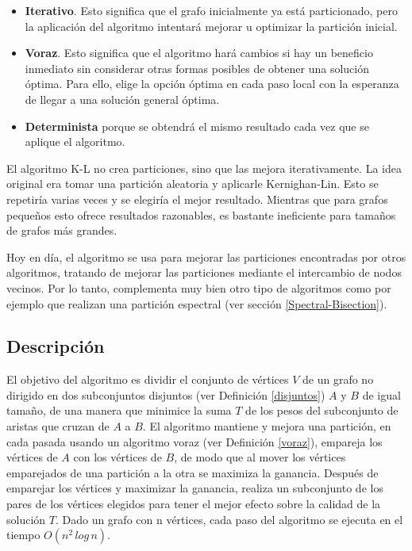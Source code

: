 \begin{itemize}
	\setlength{\parskip}{0pt}
	\setlength{\itemsep}{0pt plus 1pt}
	\item \textbf{Iterativo}. Esto significa que el grafo inicialmente ya está particionado, pero la aplicación del algoritmo intentará mejorar u optimizar la partición inicial. 
	\item \textbf{Voraz}. Esto significa que el algoritmo hará cambios si hay un beneficio inmediato sin considerar otras formas posibles de obtener una solución óptima. Para ello, elige la opción óptima en cada paso local con la esperanza de llegar a una solución general óptima.
	\item \textbf{Determinista} porque se obtendrá el mismo resultado cada vez que se aplique el algoritmo. 
\end{itemize}

El algoritmo K-L no crea particiones, sino que las mejora iterativamente. La idea original era tomar una partición aleatoria y aplicarle Kernighan-Lin\cite{KernighanLin}. Esto se repetiría varias veces y se elegiría el mejor resultado. Mientras que para grafos pequeños esto ofrece resultados razonables, es bastante ineficiente para tamaños de grafos más grandes.

Hoy en día, el algoritmo se usa para mejorar las particiones encontradas por otros algoritmos, tratando de mejorar las particiones mediante el intercambio de nodos vecinos. Por lo tanto, complementa muy bien otro tipo de algoritmos como por ejemplo que realizan una partición espectral (ver sección \ref{Spectral-Bisection}).

\subsection{Descripción}

El objetivo del algoritmo es dividir el conjunto de vértices $V$ de un grafo no dirigido en dos subconjuntos disjuntos (ver Definición \ref{disjuntos}) $A$ y $B$ de igual tamaño, de una manera que minimice la suma $T$ de los pesos del subconjunto de aristas que cruzan de $A$ a $B$. El algoritmo mantiene y mejora una partición, en cada pasada usando un algoritmo voraz (ver Definición \ref{voraz}), empareja los vértices de $A$ con los vértices de $B$, de modo que al mover los vértices emparejados de una partición a la otra se maximiza la ganancia. Después de emparejar los vértices y maximizar la ganancia, realiza un subconjunto de los pares de los vértices elegidos para tener el mejor efecto sobre la calidad de la solución $T$. Dado un grafo con n vértices, cada paso del algoritmo se ejecuta en el tiempo $O({n}^2 \, log \, n)$.

